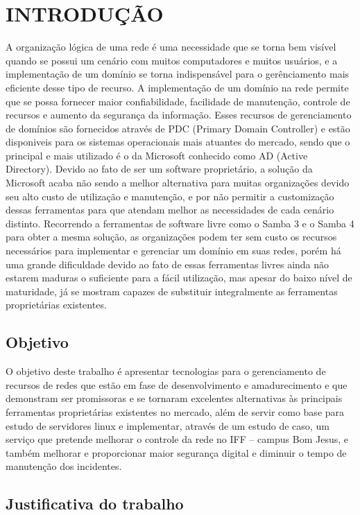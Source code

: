 \chapter{INTRODUÇÃO}

A organização lógica de uma rede é uma necessidade que se torna bem visível quando se possui um cenário com muitos computadores e muitos usuários, e a implementação de um domínio se torna indispensável para o gerênciamento mais eficiente desse tipo de recurso. A implementação de um domínio na rede permite que se possa fornecer maior confiabilidade, facilidade de manutenção, controle de recursos e aumento da segurança da informação.
Esses recursos de gerenciamento de domínios são fornecidos através de PDC (Primary Domain Controller) e estão disponiveis para os sistemas operacionais mais atuantes do mercado, sendo que o principal e mais utilizado é o da Microsoft conhecido como AD (Active Directory).
Devido ao fato de ser um software proprietário, a solução da Microsoft acaba não sendo a melhor alternativa para muitas organizações devido seu alto custo de utilização e manutenção, e por não permitir a customização dessas ferramentas para que atendam melhor as necessidades de cada cenário distinto.
Recorrendo a ferramentas de software livre como o Samba 3 e o Samba 4 para obter a mesma solução, as organizações podem ter sem custo os recursos necessários para implementar e gerenciar um domínio em suas redes, porém há uma grande dificuldade devido ao fato de essas ferramentas livres ainda não estarem maduras o suficiente para a fácil utilização, mas apesar do baixo nível de maturidade, já se mostram capazes de substituir integralmente as ferramentas proprietárias existentes.

\section{Objetivo}

O objetivo deste trabalho é apresentar tecnologias para o gerenciamento de recursos de redes que estão em fase de desenvolvimento e amadurecimento e que demonstram ser promissoras e se tornaram excelentes alternativas às principais ferramentas proprietárias existentes no mercado, além de servir como base para estudo de servidores linux e implementar, através de um estudo de caso, um serviço que pretende melhorar o controle da rede no IFF – campus Bom Jesus, e também melhorar e proporcionar maior segurança digital e diminuir o tempo de manutenção dos incidentes.

\section{Justificativa do trabalho}

